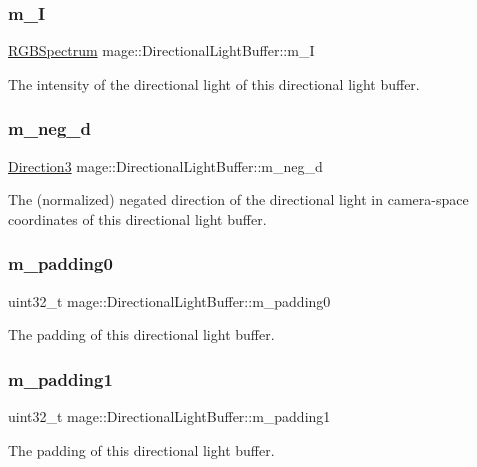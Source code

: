 \subsubsection{\texorpdfstring{m\+\_\+I}{m\_I}}
{\footnotesize\ttfamily \hyperlink{structmage_1_1_r_g_b_spectrum}{R\+G\+B\+Spectrum} mage\+::\+Directional\+Light\+Buffer\+::m\+\_\+I}

The intensity of the directional light of this directional light buffer. \hypertarget{structmage_1_1_directional_light_buffer_af3a1952cf82b66730868573a4b581ab4}{}\label{structmage_1_1_directional_light_buffer_af3a1952cf82b66730868573a4b581ab4} 
\subsubsection{\texorpdfstring{m\+\_\+neg\+\_\+d}{m\_neg\_d}}
{\footnotesize\ttfamily \hyperlink{structmage_1_1_direction3}{Direction3} mage\+::\+Directional\+Light\+Buffer\+::m\+\_\+neg\+\_\+d}

The (normalized) negated direction of the directional light in camera-\/space coordinates of this directional light buffer. \hypertarget{structmage_1_1_directional_light_buffer_af2e82dd3f47a965e009db19da9fb5167}{}\label{structmage_1_1_directional_light_buffer_af2e82dd3f47a965e009db19da9fb5167} 
\subsubsection{\texorpdfstring{m\+\_\+padding0}{m\_padding0}}
{\footnotesize\ttfamily uint32\+\_\+t mage\+::\+Directional\+Light\+Buffer\+::m\+\_\+padding0}

The padding of this directional light buffer. \hypertarget{structmage_1_1_directional_light_buffer_a81074641afb7ae296f7c6ee1b3fb12a2}{}\label{structmage_1_1_directional_light_buffer_a81074641afb7ae296f7c6ee1b3fb12a2} 
\subsubsection{\texorpdfstring{m\+\_\+padding1}{m\_padding1}}
{\footnotesize\ttfamily uint32\+\_\+t mage\+::\+Directional\+Light\+Buffer\+::m\+\_\+padding1}

The padding of this directional light buffer. 